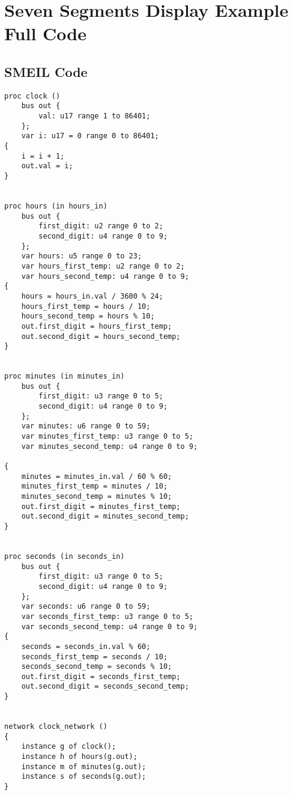 \chapter{Seven Segments Display Example Full Code}
\label{app:seven_segments}
\section*{SMEIL Code}
\begin{verbatim}
proc clock ()
    bus out {
        val: u17 range 1 to 86401;
    };
    var i: u17 = 0 range 0 to 86401;
{
    i = i + 1;
    out.val = i;
}


proc hours (in hours_in)
    bus out {
        first_digit: u2 range 0 to 2;
        second_digit: u4 range 0 to 9;
    };
    var hours: u5 range 0 to 23;
    var hours_first_temp: u2 range 0 to 2;
    var hours_second_temp: u4 range 0 to 9;
{
    hours = hours_in.val / 3600 % 24;
    hours_first_temp = hours / 10;
    hours_second_temp = hours % 10;
    out.first_digit = hours_first_temp;
    out.second_digit = hours_second_temp;
}


proc minutes (in minutes_in)
    bus out {
        first_digit: u3 range 0 to 5;
        second_digit: u4 range 0 to 9;
    };
    var minutes: u6 range 0 to 59;
    var minutes_first_temp: u3 range 0 to 5;
    var minutes_second_temp: u4 range 0 to 9;

{
    minutes = minutes_in.val / 60 % 60;
    minutes_first_temp = minutes / 10;
    minutes_second_temp = minutes % 10;
    out.first_digit = minutes_first_temp;
    out.second_digit = minutes_second_temp;
}


proc seconds (in seconds_in)
    bus out {
        first_digit: u3 range 0 to 5;
        second_digit: u4 range 0 to 9;
    };
    var seconds: u6 range 0 to 59;
    var seconds_first_temp: u3 range 0 to 5;
    var seconds_second_temp: u4 range 0 to 9;
{
    seconds = seconds_in.val % 60;
    seconds_first_temp = seconds / 10;
    seconds_second_temp = seconds % 10;
    out.first_digit = seconds_first_temp;
    out.second_digit = seconds_second_temp;
}


network clock_network ()
{
    instance g of clock();
    instance h of hours(g.out);
    instance m of minutes(g.out);
    instance s of seconds(g.out);
}

\end{verbatim}

